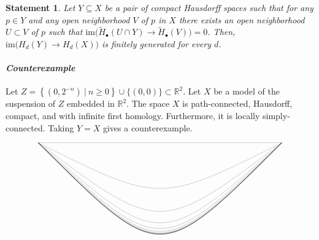 \documentclass{amsart}
\newtheorem{statement}{Statement}
\newcommand{\im}{\mathrm{im}}
\newcommand{\R}{\mathbb{R}}
\begin{document}
	\begin{statement}
		Let $Y \subseteq X$ be a pair of compact Hausdorff spaces such that for any $p \in Y$ and any open neighborhood $V$ of $p$ in $X$ there exists an open neighborhood $U \subset V$ of $p$ such that $\im \big(\widetilde H_\bullet(U \cap Y) \to \widetilde H_\bullet(V)\big) = 0$. Then, $\im \big(H_d(Y) \to H_d(X)\big)$ is finitely generated for every $d$.
	\end{statement}
	\paragraph{\textit{Counterexample}} Let $Z = \left\{\left(0, 2^{-n}\right)\ |\ n \geq 0\right\} \cup \{(0, 0)\} \subset \R^2$. Let $X$ be a model of the suspension of $Z$ embedded in $\R^2$. The space $X$ is path-connected, Hausdorff, compact, and with infinite first homology. Furthermore, it is locally simply-connected. Taking $Y = X$ gives a counterexample.
	
	\begin{equation*}
		\begin{tikzpicture}[scale=5]
		\foreach \i in {0,1,2,...,12}{
			\draw[line width=0.05mm] (-1,1) .. controls (0,1/2^\i) .. (1,1);
		}
		\end{tikzpicture}
	\end{equation*}
\end{document}
